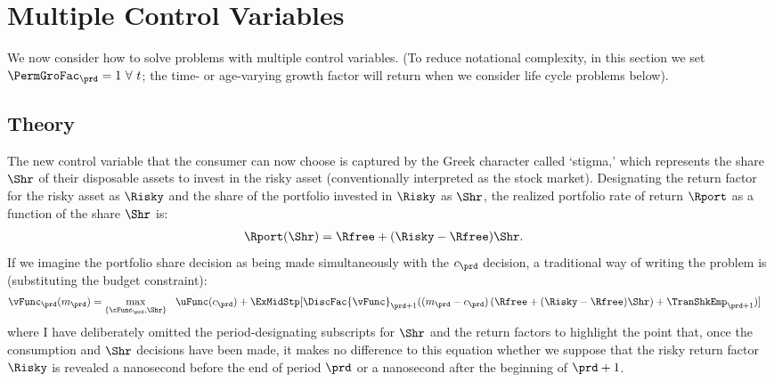 \documentclass[\econtexRoot/SolvingMicroDSOPs]{subfiles}
\begin{document}
\hypertarget{multiple-control-variables}{}
\section{Multiple Control Variables}

We now consider how to solve problems with multiple control variables.  (To reduce notational complexity, in this section we set $\PermGroFac_{\prd}=1~\forall~t$; the time- or age-varying growth factor will return when we consider life cycle problems below).

\subsection{Theory}\label{subsec:MCTheory}
The new control variable that the consumer can now choose is captured by the Greek character called `stigma,' which represents the  share $\Shr$ of their disposable assets to invest in the risky asset (conventionally interpreted as the stock market).  Designating the return factor for the risky asset as $\Risky$ and the share of the portfolio invested in $\Risky$ as $\Shr$, the realized portfolio rate of return $\Rport$ as a function of the share $\Shr$ is:
\begin{equation}\begin{gathered}\begin{aligned}
      \Rport(\Shr) &= \Rfree+(\Risky-\Rfree)\Shr \label{eq:Shr}.
    \end{aligned}\end{gathered}\end{equation}
If we imagine the portfolio share decision as being made simultaneously with the ${c}_{\prd}$ decision, a traditional way of writing the problem is (substituting the budget constraint):
\begin{equation}\begin{gathered}\begin{aligned}
      {\vFunc}_{\prd}({m}_{\prd})  & = \max_{\{\cFunc_{\prd},\Shr\}} ~~  \uFunc({c}_{\prd}) +  \ExMidStp[\DiscFac {\vFunc}_{\prd+1}(({m}_{\prd}-{c}_{\prd})\left({\Rfree+(\Risky-\Rfree)\Shr}\right) +        {\TranShkEmp}_{\prd+1})] \label{eq:Bellmanundated}
    \end{aligned}\end{gathered}\end{equation}
where I have deliberately omitted the period-designating subscripts for $\Shr$ and the return factors to highlight the point that, once the consumption and $\Shr$ decisions have been made, it makes no difference to this equation whether we suppose that the risky return factor $\Risky$ is revealed a nanosecond before the end of period $\prd$ or a nanosecond after the beginning of $\prd+1$.
\end{document}
